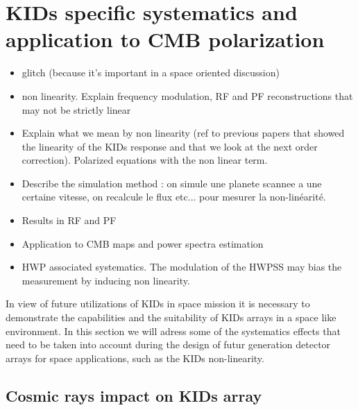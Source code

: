 
\section{KIDs specific systematics and application to CMB polarization}

\begin{itemize}
\item glitch (because it's important in a space oriented discussion)
\item non linearity. Explain frequency modulation, RF and PF reconstructions
  that may not be strictly linear
\item Explain what we mean by non linearity (ref to previous papers that showed
  the linearity of the KIDs response and that we look at the next order
  correction). Polarized equations with the non linear term.
\item Describe the simulation method : on simule une planete scannee a une
  certaine vitesse, on recalcule le flux etc... pour mesurer la
  non-lin\'earit\'e.
\item Results in RF and PF
\item Application to CMB maps and power spectra estimation
\item HWP associated systematics. The modulation of the HWPSS may bias the
  measurement by inducing non linearity.
\end{itemize}

In view of future utilizations of KIDs in space mission it is necessary to demonstrate the capabilities and the suitability of KIDs arrays in a space like environment. In this section we will adress some of the systematics effects that need to be taken into account during the design of futur generation detector arrays for space applications, such as the KIDs non-linearity.\\

\subsection{Cosmic rays impact on KIDs array}

